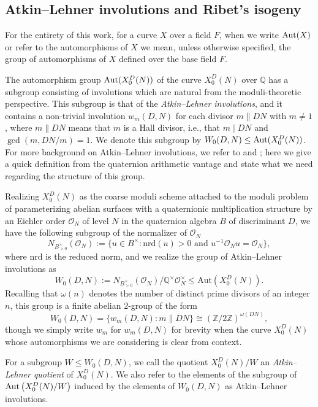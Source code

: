 \documentclass[11pt,reqno]{amsart}
\newcommand{\Q}{\mathbb{Q}}
\newcommand{\Z}{\mathbb{Z}}
\newcommand{\Aut}{{\rm Aut}}
\theoremstyle{definition}
\begin{document}
\subsection{Atkin--Lehner involutions and Ribet's isogeny}\label{section: AL}

For the entirety of this work, for a curve $X$ over a field $F$, when we write $\Aut(X)$ or refer to the automorphisms of $X$ we mean, unless otherwise specified, the group of automorphisms of $X$ defined over the base field $F$. 

The automorphism group $\Aut(X_0^D(N))$ of the curve $X_0^D(N)$ over $\Q$ has a subgroup consisting of involutions which are natural from the moduli-theoretic perspective. This subgroup is that of the \emph{Atkin--Lehner involutions}, and it contains a non-trivial involution $w_m(D,N)$ for each divisor $m \parallel DN$ with $m\ne 1$, where $m \parallel DN$ means that $m$ is a Hall divisor, i.e., that $m \mid DN$ and $\gcd(m,DN/m) = 1$. We denote this subgroup by $W_0(D,N) \leq \textnormal{Aut}(X_0^D(N))$. For more background on Atkin--Lehner involutions, we refer to \cite{Ogg77} and \cite[\S 2]{Ogg85}; here we give a quick definition from the quaternion arithmetic vantage and state what we need regarding the structure of this group.

Realizing $X_0^D(N)$ as the coarse moduli scheme attached to the moduli problem of parameterizing abelian surfaces with a quaternionic multiplication structure by an Eichler order $\mathcal{O}_N$ of level $N$ in the quaternion algebra $B$ of discriminant $D$, we have the following subgroup of the normalizer of $\mathcal{O}_N$ 
\[N_{{B}^\times_{> 0}}(\mathcal{O}_N) := \{u \in {B}^\times : \text{nrd}(u) > 0 \text{ and } u^{-1} \mathcal{O}_N u = \mathcal{O}_N \},\] 
where $\text{nrd}$ is the reduced norm, and we realize the group of Atkin--Lehner involutions as 
\[ W_0(D,N) := N_{{B}^\times_{> 0}}(\mathcal{O}_N) / \mathbb{Q}^\times \mathcal{O}_N^\times \leq \text{Aut}(X_0^D(N)). \]
Recalling that $\omega(n)$ denotes the number of distinct prime divisors of an integer $n$, this group is a finite abelian $2$-group of the form
\[
W_0(D,N) = \{w_m(D,N) : m \parallel DN\} \cong \left(\Z/2\Z\right)^{\omega(DN)},
\]
though we simply write $w_m$ for $w_m(D,N)$ for brevity when the curve $X_0^D(N)$ whose automorphisms we are considering is clear from context.

For a subgroup $W \leq W_0(D,N)$, we call the quotient $X_0^D(N)/W$ an \emph{Atkin--Lehner quotient} of $X_0^D(N)$. We also refer to the elements of the subgroup of $\Aut\left(X_0^D(N)/W\right)$ induced by the elements of $W_0(D,N)$ as Atkin--Lehner involutions.  
\end{document}
